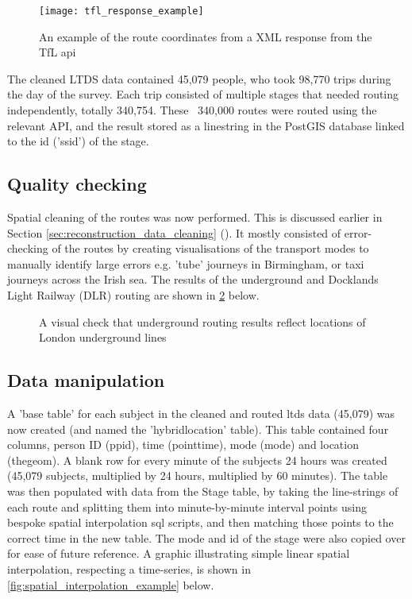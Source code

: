 \begin{figure}[H]
\centering
\texttt{[image: tfl\_response\_example]}
\caption{An example of the route coordinates from a XML response from the TfL \gls{api}}
\label{fig:tfl_response_example}
\end{figure}

The cleaned LTDS data contained 45,079 people, who took 98,770 trips during the day of the survey. Each trip consisted of multiple stages that needed routing independently, totally 340,754. These ~340,000 routes were routed using the relevant API, and the result stored as a linestring in the PostGIS database linked to the id ('ssid') of the stage.

\subsection{Quality checking}
\label{sec:reconstruction_quality_checking}

Spatial cleaning of the routes was now performed. This is discussed earlier in Section \ref{sec:reconstruction_data_cleaning} (). It mostly consisted of error-checking of the routes by creating visualisations of the transport modes to manually identify large errors e.g. 'tube' journeys in Birmingham, or taxi journeys across the Irish sea. The results of the underground and Docklands Light Railway (DLR) routing are shown in \ref{fig:underground_routing} below.

\begin{landscape}

\begin{figure}[H]
\centering
{}
\caption{A visual check that underground routing results reflect locations of London underground lines}
\label{fig:underground_routing}
\end{figure}

\end{landscape}

\subsection{Data manipulation}
\label{sec:reconstruction_data_manipulation}

A 'base table' for each subject in the cleaned and routed \gls{ltds} data (45,079) was now created (and named the 'hybrid\textunderscore location' table). This table contained four columns, person ID (ppid), time (pointtime), mode (mode) and location (thegeom). A blank row for every minute of the subjects 24 hours was created (45,079 subjects, multiplied by 24 hours, multiplied by 60 minutes). The table was then populated with data from the Stage table, by taking the line-strings of each route and splitting them into minute-by-minute interval points using bespoke spatial interpolation \gls{sql} scripts, and then matching those points to the correct time in the new table. The mode and id of the stage were also copied over for ease of future reference. A graphic illustrating simple linear spatial interpolation, respecting a time-series, is shown in \ref{fig:spatial_interpolation_example} below.

